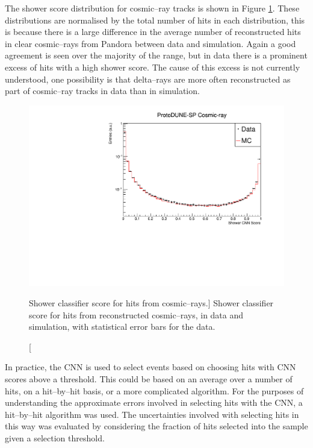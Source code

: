 The shower score distribution for cosmic--ray tracks is shown in Figure
\ref{fig:cosmic_muon_cnn}. These distributions are normalised by the total
number of hits in each distribution, this is because there is a large difference
in the average number of reconstructed hits in clear cosmic--rays from Pandora
between data and simulation. Again a good agreement is seen over the majority 
of the range, but in data there is a prominent excess of hits with a high 
shower score. The cause of this excess is not currently understood, one
possibility is that delta--rays are more often reconstructed as part of
cosmic--ray tracks in data than in simulation.

\begin{figure}
	\centering
	\includegraphics[width=\textwidth]{figures/hit_cnn_cosmics.pdf}
	\caption
	[Shower classifier score for hits from cosmic--rays.]
	{Shower classifier score for hits from reconstructed cosmic--rays, in data and
	simulation, with statistical error bars for the data.}
	\label{fig:cosmic_muon_cnn}
\end{figure}

\medskip\noindent
In practice, the CNN is used to select events based on choosing hits with 
CNN scores above a threshold. This could be based on an average over a number 
of hits, on a hit--by--hit basis, or a more complicated algorithm. For the 
purposes of understanding the approximate errors involved in selecting hits 
with the CNN, a hit--by--hit algorithm was used. The uncertainties involved 
with selecting hits in this way was evaluated by considering the fraction of 
hits selected into the sample given a selection threshold. 

